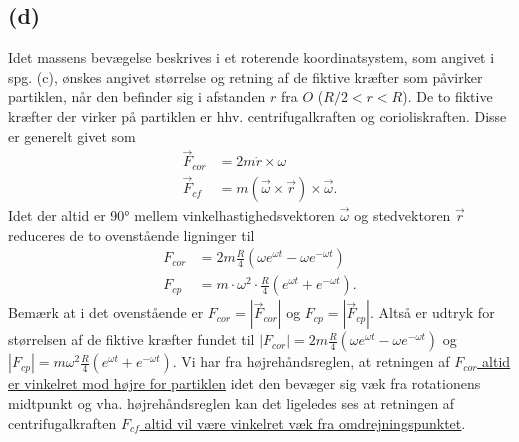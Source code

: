 \documentclass[12pt]{article}
\theoremstyle{definition}
\begin{document}
\subsection*{(d)}
Idet massens bevægelse beskrives i et roterende koordinatsystem, som angivet i spg. (c), ønskes angivet størrelse og retning af de fiktive kræfter som påvirker partiklen, når den befinder sig i afstanden $r$ fra $O$ ($R / 2 < r < R$). 
\bigbreak
De to fiktive kræfter der virker på partiklen er hhv. centrifugalkraften og corioliskraften. Disse er generelt givet som
\begin{align*}
  \Vec{F}_{cor} &= 2m \dot{r} \times \omega \\
  \Vec{F}_{cf} &= m \left( \Vec{\omega} \times \Vec{r} \right) \times \Vec{\omega}
.\end{align*}
Idet der altid er \ang{90} mellem vinkelhastighedsvektoren $\Vec{\omega}$ og stedvektoren $\Vec{r}$ reduceres de to ovenstående ligninger til
\begin{align*}
  F_{cor} &= 2m \frac{R}{4} \left( \omega e^{\omega t} - \omega e ^{-\omega t} \right) \\
  F_{cp} &= m \cdot \omega^2 \cdot \frac{R}{4} \left( e^{\omega t} + e^{-\omega t} \right)
.\end{align*}
Bemærk at i det ovenstående er $F_{cor} = |\Vec{F}_{cor}|$ og $F_{cp} = |\Vec{F}_{cp}|$. Altså er udtryk for størrelsen af de fiktive kræfter fundet til \underline{\underline{$|F_{cor}| = 2m \frac{R}{4} \left( \omega e^{\omega t} - \omega e^{-\omega t}\right)$}} og \underline{\underline{$|F_{cp}| = m \omega^2 \frac{R}{4} \left( e^{\omega t} + e^{-\omega t} \right)$}}. Vi har fra højrehåndsreglen, at retningen af \underline{\underline{$F_{cor}$ altid er vinkelret mod højre for partiklen}} idet den bevæger sig væk fra rotationens midtpunkt og vha. højrehåndsreglen kan det ligeledes ses at retningen af centrifugalkraften \underline{\underline{$F_{cf}$ altid vil være vinkelret væk fra omdrejningspunktet}}.
\end{document}
